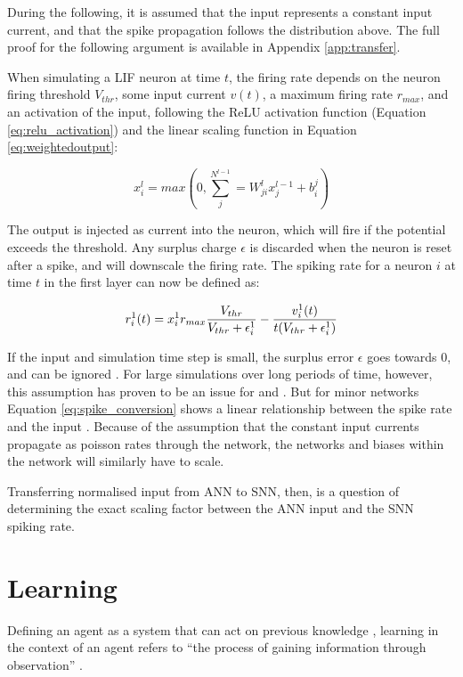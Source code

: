 \documentclass[report.tex]{subfiles}
\begin{document}
During the following, it is assumed that the input represents a constant
input current, and that the spike propagation follows the distribution
above.
The full proof for the following argument is available in Appendix \ref{app:transfer}.

When simulating a LIF
neuron at time $t$, the firing rate depends on the neuron firing threshold $V_{thr}$,
some input current $v(t)$, a maximum
firing rate $r_{max}$, and an activation of the input, following the
ReLU activation function (Equation \ref{eq:relu_activation}) and 
the linear scaling function in Equation \ref{eq:weightedoutput}:

\begin{equation}
x_i^l = max\left(0, \sum^{N^{l - 1}}_j= W^l_{ji} x_j^{l - 1} + b_i^j\right)
  \label{eq:relu_activation}
\end{equation}

The output is injected as current into the neuron, which will fire if the
potential exceeds the threshold.
Any surplus charge $\epsilon$ is discarded when the neuron is reset
after a spike, and will downscale the firing rate.
The spiking rate for a neuron $i$ at time $t$ in the first layer can
now be defined as:

\begin{equation}
r_i^1(t) = x_i^1 r_{max} {V_{thr} \over V_{thr} + \epsilon_i^1 } - {v_i^1(t) \over t (V_{thr} + \epsilon_i^1) }
\label{eq:spike_conversion}
\end{equation}

If the input and simulation time step is small, the surplus
error $\epsilon$ goes towards 0, and can be ignored \cite{Rueckauer2017}.
For large simulations over long periods of time, however, this assumption has proven to be an issue for \citeauthor{Diehl2015} and
\citeauthor{Rueckauer2017}.
But for minor networks Equation \ref{eq:spike_conversion} shows a 
linear relationship between the spike rate and the input
\cite{Rueckauer2017}.
Because of the assumption that the constant input currents propagate as poisson rates
through the network, the networks and biases within the network will similarly
have to scale.

Transferring normalised input from \gls{ANN} to \gls{SNN}, then, is
a question of determining the exact scaling factor between the \gls{ANN} input
and the \gls{SNN} spiking rate.

\section{Learning}  \label{sec:learning}
Defining an \gls{agent} as a system that can act on previous knowledge
\cite{Russel2007}, learning in the context of an \gls{agent}
refers to ``the process of gaining
information through observation'' \cite{sep:learning-formal}.
\end{document}
